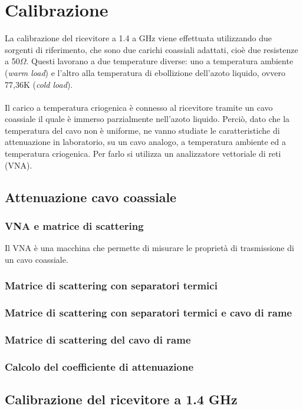 \section{Calibrazione}
La calibrazione del ricevitore a 1.4 a GHz viene effettuata utilizzando due sorgenti di riferimento, che sono due carichi coassiali adattati, cioè due resistenze a 50$\Omega$. Questi lavorano a due temperature diverse: uno a temperatura ambiente (\textit{warm load}) e l'altro alla temperatura di ebollizione dell'azoto liquido, ovvero 77,36K (\textit{cold load}). \\\\Il carico a temperatura criogenica è connesso al ricevitore tramite un cavo coassiale il quale è immerso parzialmente nell'azoto liquido. Perciò, dato che la temperatura del cavo non è uniforme, ne vanno studiate le caratteristiche di attenuazione in laboratorio, su un cavo analogo, a temperatura ambiente ed a temperatura criogenica. Per farlo si utilizza un analizzatore vettoriale di reti (VNA).

\subsection{Attenuazione cavo coassiale}
\subsubsection{VNA e matrice di scattering}
Il VNA è una macchina che permette di misurare le proprietà di trasmissione di un cavo coassiale.
\subsubsection{Matrice di scattering con separatori termici}
\subsubsection{Matrice di scattering con separatori termici e cavo di rame}
\subsubsection{Matrice di scattering del cavo di rame}
\subsubsection{Calcolo del coefficiente di attenuazione}


\subsection{Calibrazione del ricevitore a 1.4 GHz}
